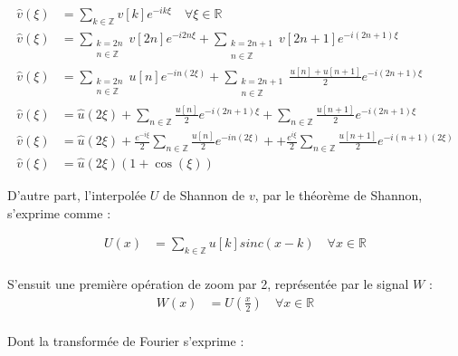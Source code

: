 \documentclass[12pt,a4paper,onecolumn]{article}
\begin{document}
\begin{equation}
	\begin{split}
		\hat{v}(\xi) &= \sum_{k\in\mathbb{Z}}v[k]e^{-ik\xi} \quad \forall \xi \in \mathbb{R}\\
		\hat{v}(\xi) &= \sum_{\substack{k = 2n \\n\in\mathbb{Z}}}v[2n]e^{-i2n\xi} + \sum_{\substack{k = 2n + 1 \\n\in\mathbb{Z}}}v[2n + 1]e^{-i(2n+1)\xi}\\
		\hat{v}(\xi) &= \sum_{\substack{k = 2n \\n\in\mathbb{Z}}}u[n]e^{-in(2\xi)} + \sum_{\substack{k = 2n + 1 \\n\in\mathbb{Z}}}\frac{u[n] + u[n + 1]}{2}e^{-i(2n+1)\xi}\\
		\hat{v}(\xi) &= \hat{u}(2\xi) + \sum_{n\in\mathbb{Z}}\frac{u[n]}{2}e^{-i(2n+1)\xi} + \sum_{n\in\mathbb{Z}}\frac{u[n + 1]}{2}e^{-i(2n+1)\xi}\\
		\hat{v}(\xi) &= \hat{u}(2\xi) + \frac{e^{-i\xi}}{2}\sum_{n\in\mathbb{Z}}\frac{u[n]}{2}e^{-in(2\xi)} ++ \frac{e^{i\xi}}{2}\sum_{n\in\mathbb{Z}}\frac{u[n + 1]}{2}e^{-i(n + 1)(2\xi)}\\
		\hat{v}(\xi) &= \hat{u}(2\xi)\left(1 + \cos\left(\xi\right)\right)
	\end{split}
	\label{zoom_lin}
\end{equation}

D'autre part, l'interpolée \(U\) de Shannon de \(v\), par le théorème de Shannon, s'exprime comme :

\begin{equation}
	\begin{split}
		U(x) &= \sum_{k\in\mathbb{Z}} u[k]sinc(x-k) \quad \forall x \in \mathbb{R}\\
	\end{split}
	\label{th_shannon}
\end{equation}

S'ensuit une première opération de zoom par 2, représentée par le signal \(W\) :
\begin{equation}
	\begin{split}
		W(x) &= U(\frac{x}{2}) \quad \forall x \in \mathbb{R}\\
	\end{split}
\end{equation}

Dont la transformée de Fourier s'exprime :
\end{document}
